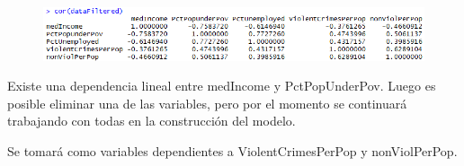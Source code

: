 \documentclass[a4paper,10pt,twocolumn]{article}
\begin{document}
\begin{figure}[H]
	\begin{center}
		\includegraphics[width=\columnwidth]{figures/correlation.png}
	\end{center}	
\end{figure}

Existe una dependencia lineal entre medIncome y PctPopUnderPov. Luego es posible
eliminar una de las variables, pero por el momento se continuará trabajando con todas en
la construcción del modelo.

Se tomará como variables dependientes a ViolentCrimesPerPop y nonViolPerPop.
\end{document}
